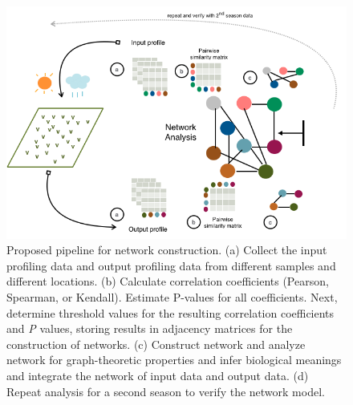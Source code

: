 \begin{landscape}

\begin{figure}[h!]
\centering
\includegraphics[width=6in]{pipeline}

\caption[Proposed pipeline for network construction]{Proposed pipeline for network construction. (a) Collect the input profiling data and output profiling data from different samples and different locations. (b) Calculate correlation coefficients (Pearson, Spearman, or Kendall). Estimate P-values for all coefficients. Next, determine threshold values for the resulting correlation coefficients and \textit{P} values, storing results in adjacency matrices for the construction of networks. (c) Construct network and analyze network for graph-theoretic properties and infer biological meanings and integrate the network of input data and output data. (d) Repeat analysis for a second season to verify the network model.}
\label{fig:pipeline}
\end{figure}
\end{landscape}

